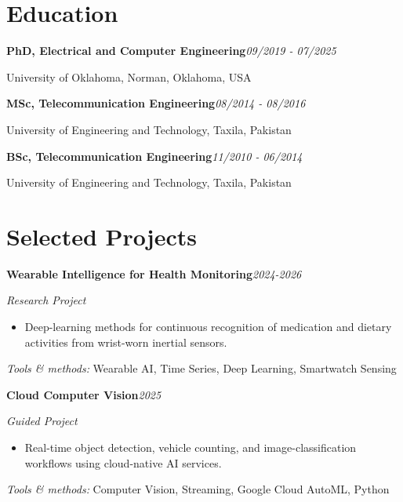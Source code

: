 \documentclass[9pt,letterpaper]{extarticle}
\newcommand{\entry}[2]{\Needspace{4\baselineskip}\textbf{#1}\hfill\textit{#2}\par}
\begin{document}
\section{Education}
\entry{PhD, Electrical and Computer Engineering}{09/2019 - 07/2025}
University of Oklahoma, Norman, Oklahoma, USA\par
\entry{MSc, Telecommunication Engineering}{08/2014 - 08/2016}
University of Engineering and Technology, Taxila, Pakistan\par
\entry{BSc, Telecommunication Engineering}{11/2010 - 06/2014}
University of Engineering and Technology, Taxila, Pakistan\par
{}
\section{Selected Projects}
\entry{Wearable Intelligence for Health Monitoring}{2024-2026}
\textit{Research Project}\par
\begin{itemize}
\item Deep-learning methods for continuous recognition of medication and dietary activities from wrist-worn inertial sensors.
\end{itemize}
{\small\textit{Tools \& methods:} Wearable AI, Time Series, Deep Learning, Smartwatch Sensing\par}
\entry{Cloud Computer Vision}{2025}
\textit{Guided Project}\par
\begin{itemize}
\item Real-time object detection, vehicle counting, and image-classification workflows using cloud-native AI services.
\end{itemize}
{\small\textit{Tools \& methods:} Computer Vision, Streaming, Google Cloud AutoML, Python\par}
\end{document}
